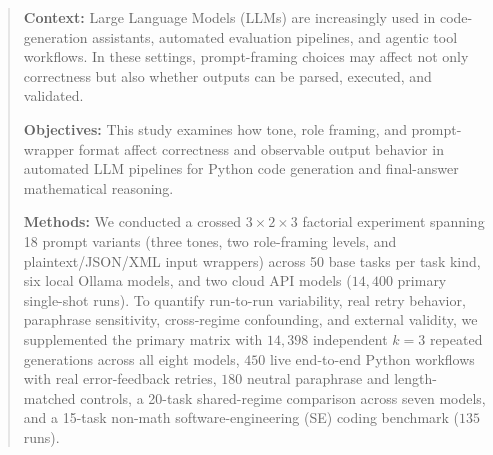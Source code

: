 \documentclass[a4paper,fleqn]{cas-sc}
\begin{document}
\begin{abstract}
\textbf{Context:} Large Language Models (LLMs) are increasingly used in code-generation assistants, automated evaluation pipelines, and agentic tool workflows. In these settings, prompt-framing choices may affect not only correctness but also whether outputs can be parsed, executed, and validated.

\textbf{Objectives:} This study examines how tone, role framing, and prompt-wrapper format affect correctness and observable output behavior in automated LLM pipelines for Python code generation and final-answer mathematical reasoning.

\textbf{Methods:} We conducted a crossed $3 \times 2 \times 3$ factorial experiment spanning 18 prompt variants (three tones, two role-framing levels, and plaintext/JSON/XML input wrappers) across 50 base tasks per task kind, six local Ollama models, and two cloud API models ($14{,}400$ primary single-shot runs). To quantify run-to-run variability, real retry behavior, paraphrase sensitivity, cross-regime confounding, and external validity, we supplemented the primary matrix with $14{,}398$ independent $k = 3$ repeated generations across all eight models, $450$ live end-to-end Python workflows with real error-feedback retries, $180$ neutral paraphrase and length-matched controls, a 20-task shared-regime comparison across seven models, and a 15-task non-math software-engineering (SE) coding benchmark ($135$ runs).


\end{abstract}
\end{document}
